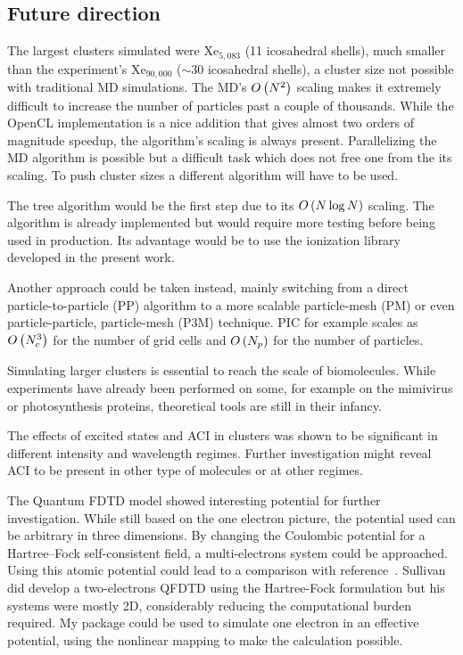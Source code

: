 \subsection{Future direction}

The largest clusters simulated were Xe$_{5,083}$ (11
icosahedral shells), much smaller than the experiment's Xe$_{90,000}$
($\sim$30 icosahedral shells), a cluster size not possible with traditional 
MD simulations. The MD's $O\left( N^2 \right)$ scaling makes it extremely difficult
to increase the number of particles past a couple of thousands. While
the OpenCL implementation is a nice addition that gives almost two orders 
of magnitude speedup, the algorithm's scaling is always present.
Parallelizing the MD algorithm is possible but a difficult task which does
not free one from the its scaling. To push cluster sizes a different
algorithm will have to be used.

The tree algorithm would be the first step due to its $O\left( N \log N \right)$ scaling.
The algorithm is already implemented but would require more testing
before being used in production. Its advantage would be to use the
ionization library developed in the present work.

Another approach could be taken instead,
mainly switching from a direct particle-to-particle (PP) algorithm to a more
scalable particle-mesh (PM) or even particle-particle, particle-mesh (P3M)
technique. PIC for example scales as $O\left( N_c^3 \right)$ for the number of grid cells and
$O\left( N_p \right)$ for the number of particles.

Simulating larger clusters is essential to reach the scale of biomolecules.
While experiments have already been performed on some, for example
on the mimivirus or photosynthesis proteins, theoretical tools are still
in their infancy.

The effects of excited states and ACI in clusters was shown to be significant
in different intensity and wavelength regimes. Further investigation might
reveal ACI to be present in other type of molecules or at other regimes.

The Quantum FDTD model showed interesting potential for further investigation.
While still based on the one electron picture, the potential used can
be arbitrary in three dimensions. By changing the Coulombic potential
for a Hartree–Fock self-consistent field, a multi-electrons system
could be approached. Using this atomic potential could lead to a comparison 
with reference~\cite{Walters2006}.
Sullivan did develop a two-electrons QFDTD using the
Hartree-Fock formulation but his systems were mostly 2D, considerably reducing
the computational burden required. My package could be used to simulate one
electron in an effective potential, using the nonlinear mapping to make the
calculation possible.


